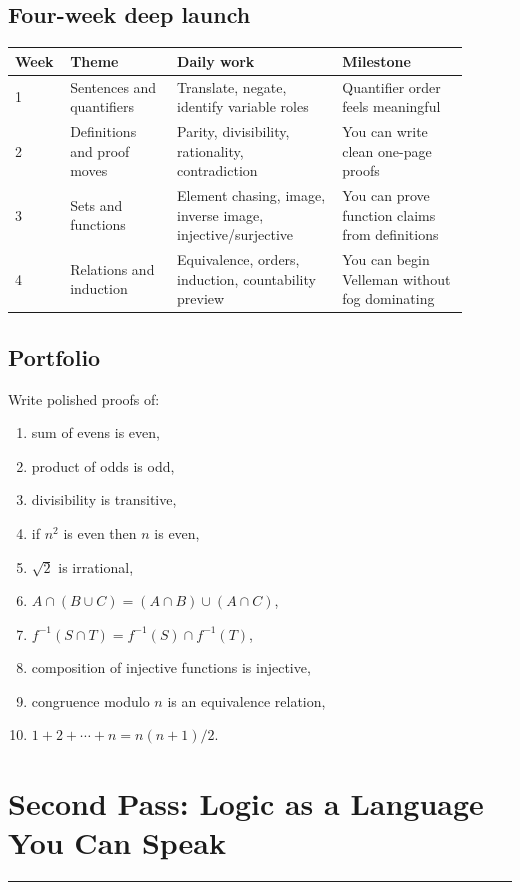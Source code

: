 \documentclass[12pt]{article}
\newcommand{\chapterline}{\vspace{0.4em}\hrule\vspace{0.8em}}
\begin{document}
\subsection{Four-week deep launch}

\begin{longtable}{p{0.08\linewidth}p{0.22\linewidth}p{0.34\linewidth}p{0.26\linewidth}}
\toprule
Week & Theme & Daily work & Milestone \\
\midrule
1 & Sentences and quantifiers & Translate, negate, identify variable roles & Quantifier order feels meaningful \\
2 & Definitions and proof moves & Parity, divisibility, rationality, contradiction & You can write clean one-page proofs \\
3 & Sets and functions & Element chasing, image, inverse image, injective/surjective & You can prove function claims from definitions \\
4 & Relations and induction & Equivalence, orders, induction, countability preview & You can begin Velleman without fog dominating \\
\bottomrule
\end{longtable}

\subsection{Portfolio}

Write polished proofs of:

\begin{enumerate}
\item sum of evens is even,
\item product of odds is odd,
\item divisibility is transitive,
\item if $n^2$ is even then $n$ is even,
\item $\sqrt2$ is irrational,
\item $A\cap(B\cup C)=(A\cap B)\cup(A\cap C)$,
\item $f^{-1}(S\cap T)=f^{-1}(S)\cap f^{-1}(T)$,
\item composition of injective functions is injective,
\item congruence modulo $n$ is an equivalence relation,
\item $1+2+\cdots+n=n(n+1)/2$.
\end{enumerate}

\newpage
\section{Second Pass: Logic as a Language You Can Speak}
\chapterline
\end{document}
